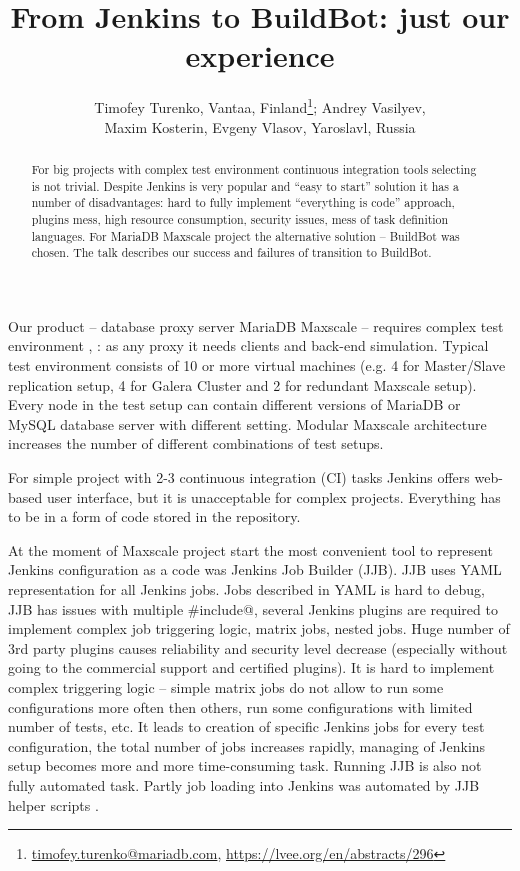 \documentclass[10pt, a5paper]{article}
\begin{document}
\title{From Jenkins to BuildBot: just our experience}
\author{Timofey Turenko, Vantaa, Finland\footnote{\url{timofey.turenko@mariadb.com}, \url{https://lvee.org/en/abstracts/296}}; Andrey Vasilyev,\\ Maxim Kosterin, Evgeny Vlasov, Yaroslavl, Russia}
\maketitle
\begin{abstract}
For big projects with complex test environment continuous integration tools selecting is not trivial. Despite Jenkins is very popular and ``easy to start'' solution it has a number of disadvan\-tages: hard to fully implement ``everything is code'' approach, plugins mess, high resource consumption, security issues, mess of task definition languages. For MariaDB Maxscale project the alternative solution -- BuildBot was chosen. The talk describes our success and failures of transition to BuildBot.
\end{abstract}
Our product -- database proxy server MariaDB Maxscale \cite{bib1} -- requires complex test environment \cite{bib2}, \cite{bib3}: as any proxy it needs clients and back-end simulation. Typical test environment consists of 10 or more virtual machines (e.g. 4 for Master/Slave replication setup, 4 for Galera Cluster and 2 for redundant Maxscale setup). Every node in the test setup can contain different versions of MariaDB or MySQL database server with different setting. Modular Maxscale architecture increases the number of different combinations of test setups.

For simple project with 2-3 continuous integration (CI) tasks Jenkins offers web-based user interface, but it is unacceptable for complex projects. Everything has to be in a form of code stored in the repository.

At the moment of Maxscale project start the most convenient tool to represent Jenkins configuration as a code was Jenkins Job Builder (JJB). JJB \cite{bib4} uses YAML representation for all Jenkins jobs. Jobs described in YAML is hard to debug, JJB has issues with multiple \verb@#include@, several Jenkins plugins are required to implement complex job triggering logic, matrix jobs, nested jobs. Huge number of 3rd party plugins causes reliability and security level decrease (especially without going to the commercial support and certified plugins). It is hard to implement complex triggering logic -- simple matrix jobs do not allow to run some configurations more often then others, run some configurations with limited number of tests, etc. It leads to creation of specific Jenkins jobs for every test configuration, the total number of jobs increases rapidly, managing of Jenkins setup becomes more and more time-consuming task. Running JJB is also not fully automated task. Partly job loading into Jenkins was automated by JJB helper scripts \cite{bib5}.
\end{document}
